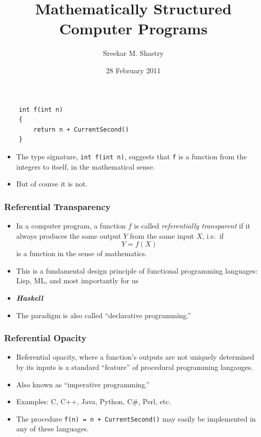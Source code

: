 \documentclass[xcolor=pdftex,dvipsnames,table]{beamer}
\title{Mathematically Structured Computer Programs}
\author{Sreekar M. Shastry}
\date{28 February 2011}
\newcommand{\hili}[1]{\emph{\textcolor{title}{#1}}}
\begin{document}
\begin{frame}
    \titlepage{}
\end{frame}

\begin{frame}[fragile]
\begin{verbatim}
    int f(int n)
    {
        return n + CurrentSecond()
    }
\end{verbatim}    \pause

\begin{itemize}
    \item The type signature, \verb|int f(int n)|, suggests that
        \verb|f| is a function from the integers to itself, in the
        mathematical sense. \pause
    \item But of course it is not.
\end{itemize}
\end{frame}

\begin{frame}
\frametitle{Referential Transparency}
    \begin{itemize}
        \item In a computer program, a function $f$ is called
            \hili{\emph{referentially transparent}} if it
            always produces the same output $Y$ from the same input
            $X$, i.e.~if \[Y = f(X)\] is a function in the sense of
            mathematics. \pause
        \item This is a fundamental design principle of functional
            programming languages: Lisp, ML, and most importantly for
            us \pause
        \item \hili{\textbf{Haskell}} \pause
        \item The paradigm is also called ``declarative programming.''
    \end{itemize}
\end{frame}

\begin{frame}[fragile]
\frametitle{Referential Opacity}
\begin{itemize}
    \item Referential opacity, where a function's outputs are not
        uniquely determined by its inputs is a standard ``feature'' of
        procedural programming langauges. \pause
    \item Also known as ``imperative programming.'' \pause
    \item Examples: C, C++, Java, Python, C\#, Perl, etc. \pause
    \item The procedure \verb|f(n) = n + CurrentSecond()| may easily be
        implemented in any of these languages.
\end{itemize}
\end{frame}
\end{document}
